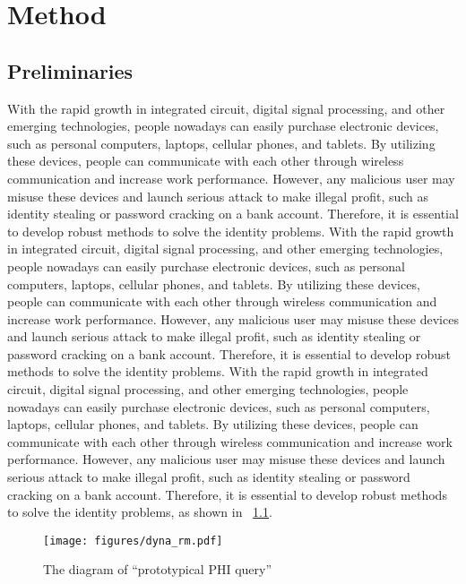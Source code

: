 \chapter{Method}
\label{cha:2_method}
\section{Preliminaries}
\label{sec:2_preliminaries}

With the rapid growth in integrated circuit, digital signal processing, and other emerging technologies, people nowadays can easily purchase electronic devices, such as personal computers, laptops, cellular phones, and tablets.  
By utilizing these devices, people can communicate with each other through wireless communication and increase work performance.      
However, any malicious user may misuse these devices and launch serious attack to make illegal profit, such as identity stealing or password cracking on a bank account.
Therefore, it is essential to develop robust methods to solve the identity problems.
With the rapid growth in integrated circuit, digital signal processing, and other emerging technologies, people nowadays can easily purchase electronic devices, such as personal computers, laptops, cellular phones, and tablets.  
By utilizing these devices, people can communicate with each other through wireless communication and increase work performance.      
However, any malicious user may misuse these devices and launch serious attack to make illegal profit, such as identity stealing or password cracking on a bank account.
Therefore, it is essential to develop robust methods to solve the identity problems.
With the rapid growth in integrated circuit, digital signal processing, and other emerging technologies, people nowadays can easily purchase electronic devices, such as personal computers, laptops, cellular phones, and tablets.  
By utilizing these devices, people can communicate with each other through wireless communication and increase work performance.      
However, any malicious user may misuse these devices and launch serious attack to make illegal profit, such as identity stealing or password cracking on a bank account.
Therefore, it is essential to develop robust methods to solve the identity problems, as shown in
~\ref{fig:2_PHI}.

\begin{figure}[t!]
  \begin{center}
    \texttt{[image: figures/dyna\_rm.pdf]}
    \caption{The diagram of ``prototypical PHI query''} 
    \label{fig:2_PHI}
  \end{center}
\end{figure}